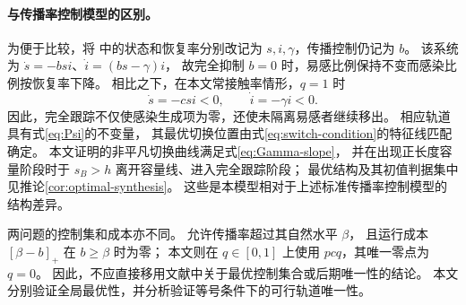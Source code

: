 \paragraph{与传播率控制模型的区别。}
为便于比较，将 \citet[式(1)]{MicloSpiroWeibull2022}
中的状态和恢复率分别改记为 $s,i,\gamma$，传播控制仍记为 $b$。
该系统为 $\dot s=-bsi$、$\dot i=(bs-\gamma)i$，
故完全抑制 $b=0$ 时，易感比例保持不变而感染比例按恢复率下降。
相比之下，在本文常接触率情形，$q=1$ 时
\[
\dot s=-csi<0,\qquad \dot i=-\gamma i<0.
\]
因此，完全跟踪不仅使感染生成项为零，还使未隔离易感者继续移出。
相应轨道具有式\eqref{eq:Psi}的不变量，
其最优切换位置由式\eqref{eq:switch-condition}的特征线匹配确定。
本文证明的非平凡切换曲线满足式\eqref{eq:Gamma-slope}，
并在出现正长度容量阶段时于 $s_B>h$ 离开容量线、进入完全跟踪阶段；
最优结构及其初值判据集中见推论\ref{cor:optimal-synthesis}。
这些是本模型相对于上述标准传播率控制模型的结构差异。

两问题的控制集和成本亦不同。
\citet[式(2)]{MicloSpiroWeibull2022}允许传播率超过其自然水平 $\beta$，
且运行成本 $[\beta-b]_+$ 在 $b\ge\beta$ 时为零；
本文则在 $q\in[0,1]$ 上使用 $pcq$，其唯一零点为 $q=0$。
因此，不应直接移用文献中关于最优控制集合或后期唯一性的结论。
本文分别验证全局最优性，并分析验证等号条件下的可行轨道唯一性。
